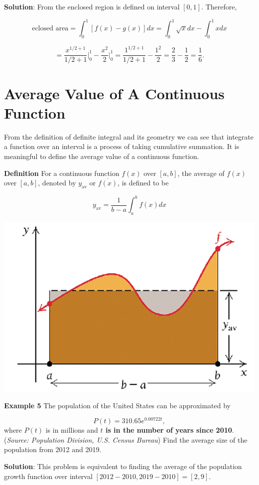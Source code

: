 \documentclass[
]{book}
\begin{document}
\textbf{Solution}: From the enclosed region is defined on interval \([0, 1]\). Therefore,

\[
\text{eclosed area} = \int_0^1 [f(x) - g(x)] dx = \int_0^1 \sqrt{x} dx - \int_0^1 x dx
\]

\[
= \frac{x^{1/2+1}}{1/2+1}\Big|_0^1 - \frac{x^2}{2}\Big|_0^1 = \frac{1^{1/2+1}}{1/2+1} - \frac{1^2}{2} = \frac{2}{3} - \frac{1}{2} = \frac{1}{6}.
\]

\hfill\break

\hypertarget{average-value-of-a-continuous-function}{%
\section{Average Value of A Continuous Function}\label{average-value-of-a-continuous-function}}

From the definition of definite integral and its geometry we can see that integrate a function over an interval is a process of taking cumulative summation. It is meaningful to define the average value of a continuous function.

\textbf{Definition} For a continuous function \(f(x)\) over \([a, b]\), the average of \(f(x)\) over \([a, b]\), denoted by \(y_{\text{av}}\) or \(\overline{f(x)}\), is defined to be

\[
y_{\text{av}} = \frac{1}{b-a} \int_a^b f(x) dx
\]

\begin{center}\includegraphics[width=0.45\linewidth]{img12/averageFunction} \end{center}

\hfill\break

\textbf{Example 5} The population of the United States can be approximated by

\[
P(t) = 310.65 e^{0.00722t},
\]
where \(P(t)\) is in millions and \textbf{\color{red}\(t\) is in the number of years since 2010}. (\emph{Source: Population Division, U.S. Census Bureau}) Find the average size of the population from 2012 and 2019.

\textbf{Solution}: This problem is equivalent to finding the average of the population growth function over interval \([2012-2010, 2019-2010] = [2,9]\).
\end{document}

